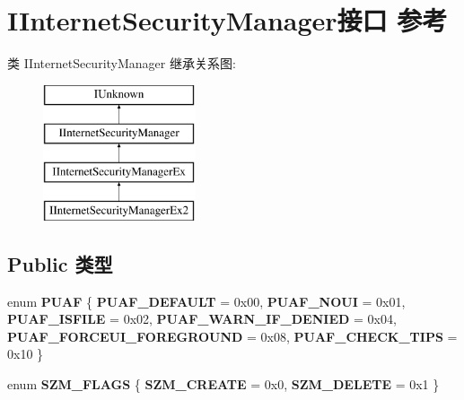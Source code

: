 \hypertarget{interface_i_internet_security_manager}{}\section{I\+Internet\+Security\+Manager接口 参考}
\label{interface_i_internet_security_manager}
类 I\+Internet\+Security\+Manager 继承关系图\+:\begin{figure}[H]
\begin{center}
\leavevmode
\includegraphics[height=4.000000cm]{interface_i_internet_security_manager}
\end{center}
\end{figure}
\subsection*{Public 类型}
\begin{DoxyCompactItemize}
\item 
\mbox{\label{interface_i_internet_security_manager_a8e1389559dcc282640b57bf2072a01a7}} 
enum {\bfseries P\+U\+AF} \{ \newline
{\bfseries P\+U\+A\+F\+\_\+\+D\+E\+F\+A\+U\+LT} = 0x00, 
{\bfseries P\+U\+A\+F\+\_\+\+N\+O\+UI} = 0x01, 
{\bfseries P\+U\+A\+F\+\_\+\+I\+S\+F\+I\+LE} = 0x02, 
{\bfseries P\+U\+A\+F\+\_\+\+W\+A\+R\+N\+\_\+\+I\+F\+\_\+\+D\+E\+N\+I\+ED} = 0x04, 
\newline
{\bfseries P\+U\+A\+F\+\_\+\+F\+O\+R\+C\+E\+U\+I\+\_\+\+F\+O\+R\+E\+G\+R\+O\+U\+ND} = 0x08, 
{\bfseries P\+U\+A\+F\+\_\+\+C\+H\+E\+C\+K\+\_\+\+T\+I\+PS} = 0x10
 \}
\item 
\mbox{\label{interface_i_internet_security_manager_aef1a2ab9df92555d61196eda370579a1}} 
enum {\bfseries S\+Z\+M\+\_\+\+F\+L\+A\+GS} \{ {\bfseries S\+Z\+M\+\_\+\+C\+R\+E\+A\+TE} = 0x0, 
{\bfseries S\+Z\+M\+\_\+\+D\+E\+L\+E\+TE} = 0x1
 \}
\end{DoxyCompactItemize}
